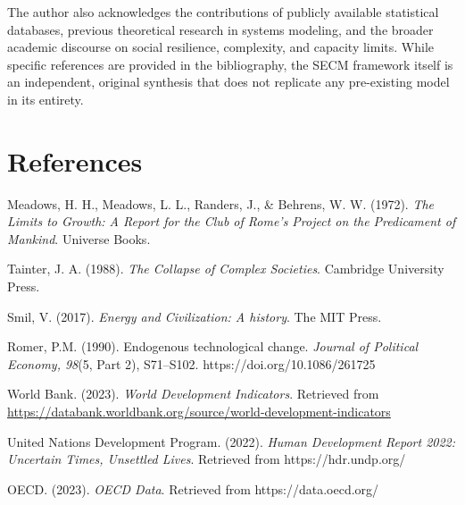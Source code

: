 \documentclass[12pt,a4paper]{article}
\begin{document}
The author also acknowledges the contributions of publicly available statistical databases, previous theoretical research in systems modeling, and the broader academic discourse on social resilience, complexity, and capacity limits.  
While specific references are provided in the bibliography, the SECM framework itself is an independent, original synthesis that does not replicate any pre-existing model in its entirety.
\section{References}

\begin{hangparas}{0.5in}{1}

Meadows, H. H., Meadows, L. L., Randers, J., \& Behrens, W. W. (1972). \textit{The Limits to Growth: A Report for the Club of Rome's Project on the Predicament of Mankind}. Universe Books.

Tainter, J. A. (1988). \textit{The Collapse of Complex Societies}. Cambridge University Press.

Smil, V. (2017). \textit{Energy and Civilization: A history}. The MIT Press.

Romer, P.M. (1990). Endogenous technological change. \textit{Journal of Political Economy, 98}(5, Part 2), S71–S102. https://doi.org/10.1086/261725

World Bank. (2023). \textit{World Development Indicators}. Retrieved from \url{https://databank.worldbank.org/source/world-development-indicators}

United Nations Development Program. (2022). \textit{Human Development Report 2022: Uncertain Times, Unsettled Lives}. Retrieved from https://hdr.undp.org/

OECD. (2023). \textit{OECD Data}. Retrieved from https://data.oecd.org/

\end{hangparas}
\end{document}

